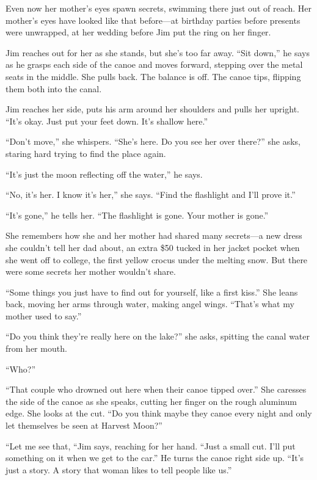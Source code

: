 \documentclass[
]{article}
\begin{document}
Even now her mother's eyes spawn secrets, swimming there just out of
reach. Her mother's eyes have looked like that before---at birthday
parties before presents were unwrapped, at her wedding before Jim put
the ring on her finger.

Jim reaches out for her as she stands, but she's too far away. ``Sit
down,'' he says as he grasps each side of the canoe and moves forward,
stepping over the metal seats in the middle. She pulls back. The balance
is off. The canoe tips, flipping them both into the canal.

Jim reaches her side, puts his arm around her shoulders and pulls her
upright. ``It's okay. Just put your feet down. It's shallow here.''

``Don't move,'' she whispers. ``She's here. Do you see her over there?''
she asks, staring hard trying to find the place again.

``It's just the moon reflecting off the water,'' he says.

``No, it's her. I know it's her,'' she says. ``Find the flashlight and
I'll prove it.''

``It's gone,'' he tells her. ``The flashlight is gone. Your mother is
gone.''

She remembers how she and her mother had shared many secrets---a new
dress she couldn't tell her dad about, an extra \$50 tucked in her
jacket pocket when she went off to college, the first yellow crocus
under the melting snow. But there were some secrets her mother wouldn't
share.

``Some things you just have to find out for yourself, like a first
kiss.'' She leans back, moving her arms through water, making angel
wings. ``That's what my mother used to say.''

``Do you think they're really here on the lake?'' she asks, spitting the
canal water from her mouth.

``Who?''

``That couple who drowned out here when their canoe tipped over.'' She
caresses the side of the canoe as she speaks, cutting her finger on the
rough aluminum edge. She looks at the cut. ``Do you think maybe they
canoe every night and only let themselves be seen at Harvest Moon?''

``Let me see that, ``Jim says, reaching for her hand. ``Just a small
cut. I'll put something on it when we get to the car.'' He turns the
canoe right side up. ``It's just a story. A story that woman likes to
tell people like us.''
\end{document}
